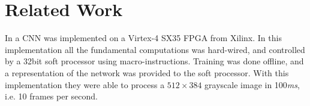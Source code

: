 \chapter{Related Work}

In \cite{Farabet2009} a CNN was implemented on a Virtex-4 SX35 FPGA from Xilinx. In this implementation all the fundamental computations was hard-wired, and controlled by a 32bit soft processor using macro-instructions. Training was done offline, and a representation of the network was provided to the soft processor. With this implementation they were able to process a $ 512 \times 384 $ grayscale image in 100\textit{ms}, i.e. 10 frames per second. 

